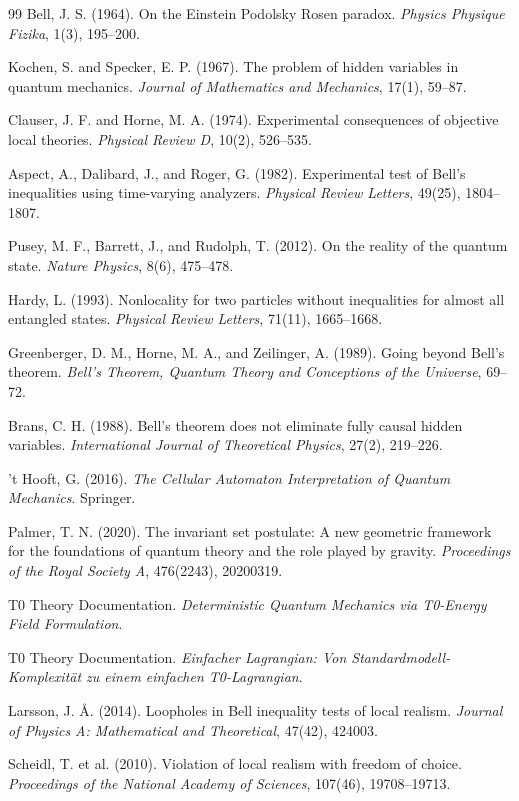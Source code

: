 			\begin{thebibliography}{99}
				Bell, J. S. (1964). On the Einstein Podolsky Rosen paradox. \textit{Physics Physique Fizika}, 1(3), 195--200.
				
				Kochen, S. and Specker, E. P. (1967). The problem of hidden variables in quantum mechanics. \textit{Journal of Mathematics and Mechanics}, 17(1), 59--87.
				
				Clauser, J. F. and Horne, M. A. (1974). Experimental consequences of objective local theories. \textit{Physical Review D}, 10(2), 526--535.
				
				Aspect, A., Dalibard, J., and Roger, G. (1982). Experimental test of Bell's inequalities using time-varying analyzers. \textit{Physical Review Letters}, 49(25), 1804--1807.
				
				Pusey, M. F., Barrett, J., and Rudolph, T. (2012). On the reality of the quantum state. \textit{Nature Physics}, 8(6), 475--478.
				
				Hardy, L. (1993). Nonlocality for two particles without inequalities for almost all entangled states. \textit{Physical Review Letters}, 71(11), 1665--1668.
				
				Greenberger, D. M., Horne, M. A., and Zeilinger, A. (1989). Going beyond Bell's theorem. \textit{Bell's Theorem, Quantum Theory and Conceptions of the Universe}, 69--72.
				
				Brans, C. H. (1988). Bell's theorem does not eliminate fully causal hidden variables. \textit{International Journal of Theoretical Physics}, 27(2), 219--226.
				
				't Hooft, G. (2016). \textit{The Cellular Automaton Interpretation of Quantum Mechanics}. Springer.
				
				Palmer, T. N. (2020). The invariant set postulate: A new geometric framework for the foundations of quantum theory and the role played by gravity. \textit{Proceedings of the Royal Society A}, 476(2243), 20200319.
				
				T0 Theory Documentation. \textit{Deterministic Quantum Mechanics via T0-Energy Field Formulation}.
				
				T0 Theory Documentation. \textit{Einfacher Lagrangian: Von Standardmodell-Komplexität zu einem einfachen T0-Lagrangian}.
				
				Larsson, J. Å. (2014). Loopholes in Bell inequality tests of local realism. \textit{Journal of Physics A: Mathematical and Theoretical}, 47(42), 424003.
				
				Scheidl, T. et al. (2010). Violation of local realism with freedom of choice. \textit{Proceedings of the National Academy of Sciences}, 107(46), 19708--19713.
			\end{thebibliography}
			